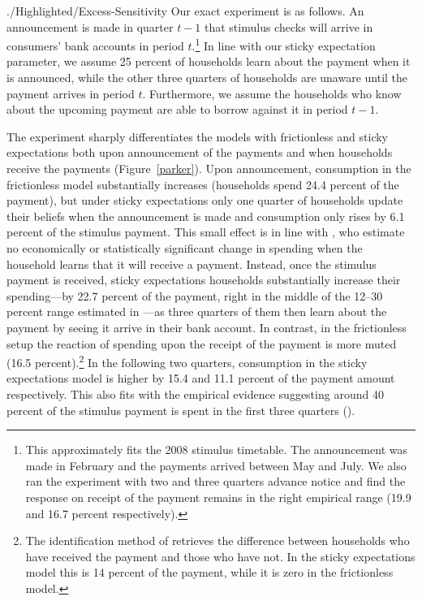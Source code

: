 \begin{verbatimwrite}{./Highlighted/Excess-Sensitivity}
Our exact experiment is as follows.  An announcement is made in quarter $t-1$ that stimulus checks will arrive in consumers' bank accounts in period $t$.\footnote{This approximately fits the 2008 stimulus timetable. The announcement was made in February and the payments arrived between May and July. We also ran the experiment with two and three quarters advance notice and find the response on receipt of the payment remains in the right empirical range (19.9 and 16.7 percent respectively).} In line with our sticky expectation parameter, we assume 25 percent of households learn about the payment when it is announced, while the other three quarters of households are unaware until the payment arrives in period $t$. Furthermore, we assume the households who know about the upcoming payment are able to borrow against it in period $t-1$.

The experiment sharply differentiates the models with frictionless and sticky expectations both upon announcement of the payments and when households receive the payments (Figure~\ref{parker}). Upon announcement, consumption in the frictionless model substantially increases (households spend 24.4 percent of the payment), but under sticky expectations only one quarter of households update their beliefs when the announcement is made and consumption only rises by 6.1 percent of the stimulus payment.  This small effect is in line with \cite{brodaParker}, who estimate no economically or statistically significant change in spending when the household learns that it will receive a payment.  Instead, once the stimulus payment is received, sticky expectations households substantially increase their spending---by 22.7 percent of the payment, right in the middle of the 12--30 percent range estimated in \cite{psjmMPC2008}---as three quarters of them then learn about the payment by seeing it arrive in their bank account. In contrast, in the frictionless setup the reaction of spending upon the receipt of the payment is more muted (16.5 percent).\footnote{The identification method of \cite{psjmMPC2008} retrieves the difference between households who have received the payment and those who have not. In the sticky expectations model this is 14 percent of the payment, while it is zero in the frictionless model.} In the following two quarters, consumption in the sticky expectations model is higher by 15.4 and 11.1 percent of the payment amount respectively. This also fits with the empirical evidence suggesting around 40 percent of the stimulus payment is spent in the first three quarters (\cite{psjmMPC2008}).


\end{verbatimwrite}
